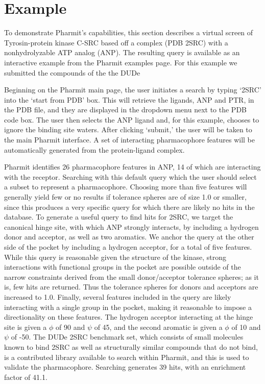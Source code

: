 \section{Example}

To demonstrate Pharmit's capabilities, this section describes a virtual screen of Tyrosin-protein kinase C-SRC based off a complex (PDB 2SRC) with a nonhydrolyzable ATP analog (ANP). The resulting query is available as an interactive example from the Pharmit examples page.  For this example we submitted the compounds of the the DUDe 

  Beginning on the Pharmit main page, the user initiates a search by typing `2SRC' into the `start from PDB' box. This will retrieve the ligands, ANP and PTR, in the PDB file, and they are displayed in the dropdown menu next to the PDB code box. The user then selects the ANP ligand and, for this example, chooses to ignore the binding site waters. After clicking `submit,' the user will be taken to the main Pharmit interface. A set of interacting pharmacophore features will be automatically generated from the protein-ligand complex.
  
  Pharmit identifies 26 pharmacophore features in ANP, 14 of which are interacting with the receptor.  Searching with this default query 
  which the user should select a subset to represent a pharmacophore. Choosing more than five features will generally yield few or no results if tolerance spheres are of size 1.0 or smaller, since this produces a very specific query for which there are likely no hits in the database. To generate a useful query to find hits for 2SRC, we target the canonical hinge site, with which ANP strongly interacts, by including a hydrogen donor and acceptor, as well as two aromatics. We anchor the query at the other side of the pocket by including a hydrogen acceptor, for a total of five features. While this query is reasonable given the structure of the kinase, strong interactions with functional groups in the pocket are possible outside of the narrow constraints derived from the small donor/acceptor tolerance spheres; as it is, few hits are returned. Thus the tolerance spheres for donors and acceptors are increased to 1.0. Finally, several features included in the query are likely interacting with a single group in the pocket, making it reasonable to impose a directionality on these features. The hydrogen acceptor interacting at the hinge site is given a $\phi$ of 90 and $\psi$ of 45, and the second aromatic is given a $\phi$ of 10 and $\psi$ of -50. The DUDe 2SRC benchmark set, which consists of small molecules known to bind 2SRC as well as structurally similar compounds that do not bind, is a contributed library available to search within Pharmit, and this is used to validate the pharmacophore. Searching generates 39 hits, with an enrichment factor of 41.1. 